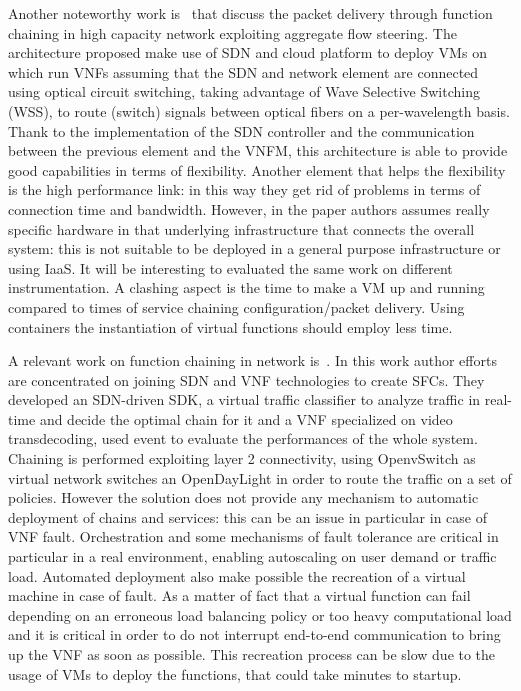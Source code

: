 Another noteworthy work is~\cite{xia2015optical} that discuss the packet
delivery through function chaining in high capacity network exploiting aggregate
flow steering. The architecture proposed make use of SDN and cloud platform to
deploy VMs on which run VNFs assuming that the SDN and network element are
connected using optical circuit switching, taking advantage of Wave Selective
Switching (WSS), to route (switch) signals between optical fibers on a
per-wavelength basis. Thank to the implementation of the SDN controller and the
communication between the previous element and the VNFM, this architecture is
able to provide good capabilities in terms of flexibility. Another element
that helps the flexibility is the high performance link: in this way they get
rid of problems in terms of connection time and bandwidth. However, in the paper
authors assumes really specific hardware in that underlying infrastructure that
connects the overall system: this is not suitable to be deployed in a general
purpose infrastructure or using IaaS. It will be interesting to evaluated the
same work on different instrumentation. A clashing aspect is the time to make a
VM up and running compared to times of service chaining configuration/packet
delivery. Using containers the instantiation of virtual functions should employ
less time.

A relevant work on function chaining in network is~\cite{trajkovska2017sdn}. In
this work author efforts are concentrated on joining SDN and VNF technologies to
create SFCs. They developed an SDN-driven SDK, a virtual traffic classifier to
analyze traffic in real-time and decide the optimal chain for it and a VNF
specialized on video transdecoding, used event to evaluate the performances of
the whole system. Chaining is performed exploiting layer 2 connectivity,
using OpenvSwitch as virtual network switches an OpenDayLight in order to
route the traffic on a set of policies. However the solution does not provide
any mechanism to automatic deployment of chains and services: this can be an
issue in particular in case of VNF fault. Orchestration and some mechanisms of
fault tolerance are critical in particular in a real environment, enabling
autoscaling on user demand or traffic load. Automated deployment also make
possible the recreation of a virtual machine in case of fault. As a matter of
fact that a virtual function can fail depending on an erroneous load balancing
policy or too heavy computational load and it is critical in order to do not
interrupt end-to-end communication to bring up the VNF as soon as possible. This
recreation process can be slow due to the usage of VMs to deploy the
functions, that could take minutes to startup.

